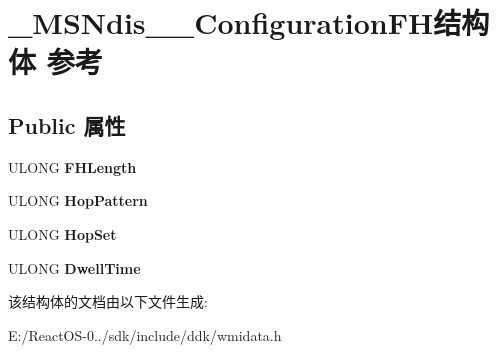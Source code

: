 \hypertarget{struct___m_s_ndis__80211___configuration_f_h}{}\section{\+\_\+\+M\+S\+Ndis\+\_\+\_\+\+Configuration\+F\+H结构体 参考}
\label{struct___m_s_ndis__80211___configuration_f_h}
\subsection*{Public 属性}
\begin{DoxyCompactItemize}
\item 
\mbox{\label{struct___m_s_ndis__80211___configuration_f_h_a374f5e8ade013dbee5356efbd66cd53b}} 
U\+L\+O\+NG {\bfseries F\+H\+Length}
\item 
\mbox{\label{struct___m_s_ndis__80211___configuration_f_h_a156c35f38c0f4d10d053c4e8d8ea6455}} 
U\+L\+O\+NG {\bfseries Hop\+Pattern}
\item 
\mbox{\label{struct___m_s_ndis__80211___configuration_f_h_accb04f604fbef134f809c8d4ec2790f3}} 
U\+L\+O\+NG {\bfseries Hop\+Set}
\item 
\mbox{\label{struct___m_s_ndis__80211___configuration_f_h_a05a762c815bbb0262e755a7324a37741}} 
U\+L\+O\+NG {\bfseries Dwell\+Time}
\end{DoxyCompactItemize}


该结构体的文档由以下文件生成\+:\begin{DoxyCompactItemize}
\item 
E\+:/\+React\+O\+S-\/0../sdk/include/ddk/wmidata.\+h\end{DoxyCompactItemize}
